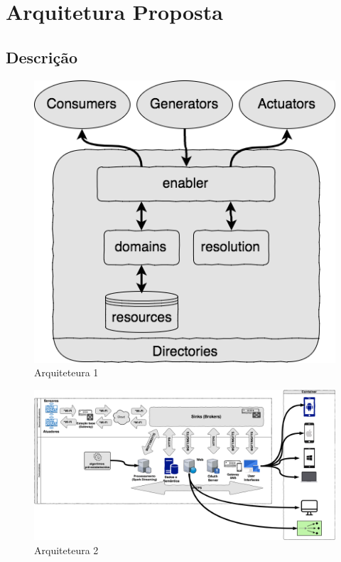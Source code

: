 \section{Arquitetura Proposta}
\subsection{Descri\c{c}\~{a}o}

\begin{figure}[tbh!]
	\centering
	\includegraphics[width=1.0\textwidth]{../images/server-types}
	\caption{Arquiteteura 1}
	\label{fig:arquitetura1}
\end{figure}

\begin{figure}[tbh!]
	\centering
	\includegraphics[width=1.0\textwidth]{../images/arquitetura_rede}
	\caption{Arquiteteura 2}
	\label{fig:arquitetura2}
\end{figure}

